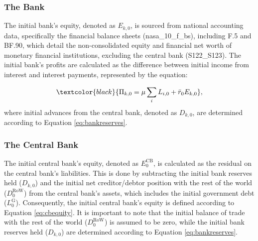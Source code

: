 \subsubsection{The Bank} \label{sec:bank_initial_conditions}
The initial bank's equity, denoted as \(E_{k,0}\), is sourced from national accounting data, specifically the financial balance sheets (nasa{\_}10{\_}f{\_}bs), including F.5 and BF.90, which detail the non-consolidated equity and financial net worth of monetary financial institutions, excluding the central bank (S122\_S123). The initial bank's profits are calculated as the difference between initial income from interest and interest payments, represented by the equation:

\begin{equation*} 
	\textcolor{black}{\Pi_{k,0} = \mu \sum_{i} L_{i,0} + \bar{r}_{0} E_{k,0}},
 \end{equation*} 
where initial advances from the central bank, denoted as \(D_{k,0}\), are determined according to Equation \eqref{eq:bankreserves}.




\subsubsection{The Central Bank}
The initial central bank's equity, denoted as \(E^{\mathrm{CB}}_{0}\), is calculated as the residual on the central bank's liabilities. This is done by subtracting the initial bank reserves held (\(D_{k,0}\)) and the initial net creditor/debtor position with the rest of the world (\(D^{\mathrm{RoW}}_{0}\)) from the central bank's assets, which includes the initial government debt (\(L^{\mathrm{G}}_{0}\)). Consequently, the initial central bank's equity is defined according to Equation \eqref{eq:cbequity}. It is important to note that the initial balance of trade with the rest of the world (\(D^{\mathrm{RoW}}_{0}\)) is assumed to be zero, while the initial bank reserves held (\(D_{k,0}\)) are determined according to Equation \eqref{eq:bankreserves}.

